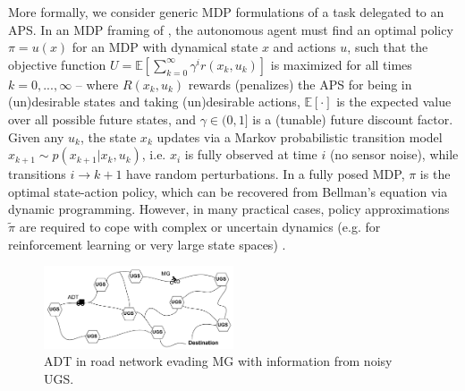More formally, we consider generic MDP formulations of a task \task{} delegated to an APS. In an MDP framing of \task{}, the autonomous agent must find an optimal policy $\pi = u(x)$ for an MDP with dynamical state $x$ and actions $u$, such that the objective function
$U = \mathbb{E} \left[\sum_{k=0}^{\infty} \gamma^i r(x_k,u_k) \right]$ is maximized for all times $k=0,...,\infty$ --  
where $R(x_k,u_k)$ rewards (penalizes) the APS for being in (un)desirable states and taking (un)desirable actions, $\mathbb{E}[\cdot]$ is the expected value over all possible future states, and $\gamma \in (0,1]$ is a (tunable) future discount factor. 
Given any $u_k$, the state $x_k$ updates via a Markov probabilistic transition model $x_{k+1} \sim p(x_{k+1}|x_{k},u_{k})$,  
i.e. $x_{i}$ is fully observed at time $i$ (no sensor noise), while transitions $i\rightarrow k+1$ have random perturbations.
In a fully posed MDP, $\pi$ is the optimal state-action policy, which can be recovered from Bellman's equation via dynamic programming. 
However, in many practical cases, policy approximations $\tilde{\pi}$ are required to cope with complex or uncertain dynamics (e.g. for reinforcement learning or very large state spaces) \cite{Kochenderfer2015-uu}. 
    
    
	\begin{figure}[t]%
    	\centering
     	\includegraphics[width=0.5\textwidth]{Figures/RoadNet}
    	\caption{ADT in road network evading MG with information from noisy UGS.} 
        \label{fig:RoadNet}
        \vspace{-0.2cm}
    \end{figure}    
    

